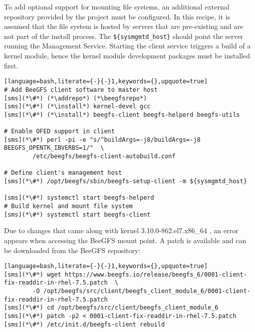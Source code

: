 To add optional support for mounting \beegfs{} file systems, an 
additional external \pkgmgr{} repository provided by the \beegfs{} project must be 
configured.  In this recipe, it is
assumed that the file system is hosted by servers that are pre-existing
and are not part of the install process. The \texttt{\$\{sysmgmtd\_host\}} should
point the server running the \beegfs{} Management Service. Starting the client service triggers
a build of a kernel module, hence the kernel module development packages must be
installed first.

\begin{lstlisting}[language=bash,literate={-}{-}1,keywords={},upquote=true]
# Add BeeGFS client software to master host
[sms](*\#*) (*\addrepo*) (*\beegfsrepo*)
[sms](*\#*) (*\install*) kernel-devel gcc
[sms](*\#*) (*\install*) beegfs-client beegfs-helperd beegfs-utils

# Enable OFED support in client
[sms](*\#*) perl -pi -e "s/^buildArgs=-j8/buildArgs=-j8 BEEGFS_OPENTK_IBVERBS=1/"  \
        /etc/beegfs/beegfs-client-autobuild.conf

# Define client's management host
[sms](*\#*) /opt/beegfs/sbin/beegfs-setup-client -m ${sysmgmtd_host}

[sms](*\#*) systemctl start beegfs-helperd
# Build kernel and mount file system
[sms](*\#*) systemctl start beegfs-client
\end{lstlisting}

Due to changes that came along with kernel 3.10.0-862.el7.x86\_64 , an error 
appears when accessing the BeeGFS mount point. A patch is available and can be 
downloaded from the BeeGFS repository:

\begin{lstlisting}[language=bash,literate={-}{-}1,keywords={},upquote=true]
[sms](*\#*) wget https://www.beegfs.io/release/beegfs_6/0001-client-fix-readdir-in-rhel-7.5.patch  \
        -O /opt/beegfs/src/client/beegfs_client_module_6/0001-client-fix-readdir-in-rhel-7.5.patch
[sms](*\#*) cd /opt/beegfs/src/client/beegfs_client_module_6
[sms](*\#*) patch -p2 < 0001-client-fix-readdir-in-rhel-7.5.patch
[sms](*\#*) /etc/init.d/beegfs-client rebuild
\end{lstlisting}

